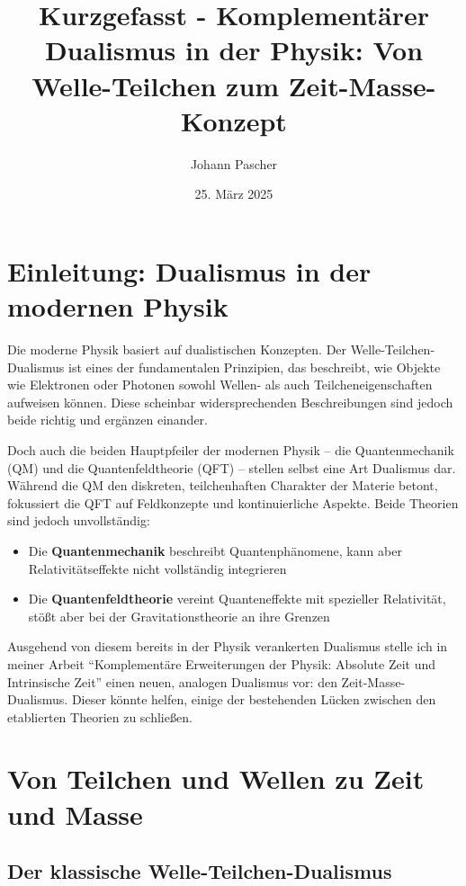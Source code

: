 \documentclass[a4paper,12pt]{article}
\begin{document}
	
	\title{Kurzgefasst - Komplementärer Dualismus in der Physik: Von Welle-Teilchen zum Zeit-Masse-Konzept}
	\author{Johann Pascher}
	\date{25. März 2025}
	\maketitle
	
	\section{Einleitung: Dualismus in der modernen Physik}
	
	Die moderne Physik basiert auf dualistischen Konzepten. Der Welle-Teilchen-Dualismus ist eines der fundamentalen Prinzipien, das beschreibt, wie Objekte wie Elektronen oder Photonen sowohl Wellen- als auch Teilcheneigenschaften aufweisen können. Diese scheinbar widersprechenden Beschreibungen sind jedoch beide richtig und ergänzen einander.
	
	Doch auch die beiden Hauptpfeiler der modernen Physik -- die Quantenmechanik (QM) und die Quantenfeldtheorie (QFT) -- stellen selbst eine Art Dualismus dar. Während die QM den diskreten, teilchenhaften Charakter der Materie betont, fokussiert die QFT auf Feldkonzepte und kontinuierliche Aspekte. Beide Theorien sind jedoch unvollständig:
	
	\begin{itemize}
		\item Die \textbf{Quantenmechanik} beschreibt Quantenphänomene, kann aber Relativitätseffekte nicht vollständig integrieren
		\item Die \textbf{Quantenfeldtheorie} vereint Quanteneffekte mit spezieller Relativität, stößt aber bei der Gravitationstheorie an ihre Grenzen
	\end{itemize}
	
	Ausgehend von diesem bereits in der Physik verankerten Dualismus stelle ich in meiner Arbeit ``Komplementäre Erweiterungen der Physik: Absolute Zeit und Intrinsische Zeit'' einen neuen, analogen Dualismus vor: den Zeit-Masse-Dualismus. Dieser könnte helfen, einige der bestehenden Lücken zwischen den etablierten Theorien zu schließen.
	
	\section{Von Teilchen und Wellen zu Zeit und Masse}
	
	\subsection{Der klassische Welle-Teilchen-Dualismus}
	
\end{document}
